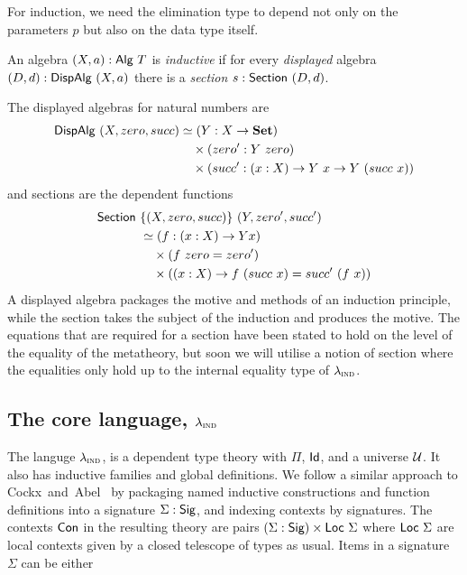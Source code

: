 For induction, we need the elimination type to depend not only on the parameters $p$
but also on the data type itself. 
\begin{definition} 
  An algebra $(X, a) : \textsf{Alg}\ T$ is \emph{inductive} if for every
\emph{displayed} algebra $(D, d) : \textsf{DispAlg}\ (X, a)$ there is a
\emph{section} $s : \textsf{Section}\ (D, d)$.
\end{definition}
The displayed algebras for natural numbers are 
\begin{align*}
  \textsf{DispAlg}\ (X, zero, succ) &\simeq (Y : X \to \mathbf{Set}) \\
   & \quad \times (zero' : Y\ zero) \\ 
   & \quad \times (succ' : (x : X) \to Y\ x \to Y\ (succ\ x))
\end{align*}
and sections are the dependent functions
\begin{align*}
  \textsf{Section}\ &\{(X, zero, succ)\}\ (Y, zero', succ') \\ 
    &\simeq (f : (x : X) \to Y x) \\
   & \quad \times (f\ zero = zero') \\
   & \quad \times ((x : X) \to f\ (succ\ x) = succ'\ (f\ x))
\end{align*}
A displayed algebra packages the motive and methods of an induction principle, while the
section takes the subject of the induction and produces the motive.
The equations that are required for a section have been stated to hold on the level of the 
equality of the metatheory, but soon we will utilise a notion of section where the equalities 
only hold up to the internal equality type of $\lambda_{\textsc{ind}}$.

\subsection{The core language, $\lambda_{\textsc{ind}}$}

The languge $\lambda_{\textsc{ind}}$, is a dependent type theory with $\Pi$, $\textsf{Id}$, and
a universe $\mathcal{U}$.
It also has inductive families and global definitions. We follow a similar
approach to Cockx~and~Abel~\cite{Cockx2018-fk} by packaging named inductive
constructions and function definitions into a signature $\Sigma : \textsf{Sig}$, and
indexing contexts by signatures. The contexts $\textsf{Con}$ in the resulting theory are
pairs $(\Sigma : \textsf{Sig}) \times \textsf{Loc}\ \Sigma$ where $\Loc\ \Sigma$ are local
contexts given by a closed telescope of types as usual. Items in a signature
$\Sigma$ can be either


